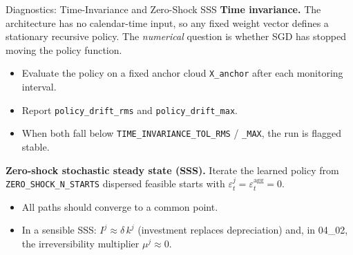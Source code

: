 \documentclass[aspectratio=169,11pt]{beamer}
\newcommand{\emphc}[1]{\textcolor{harvardcrimson}{#1}}
\begin{document}
\begin{frame}{Diagnostics: Time-Invariance and Zero-Shock SSS}
\textbf{Time invariance.}  The architecture has no calendar-time input, so any fixed weight vector defines a stationary recursive policy.  The \emph{numerical} question is whether SGD has stopped moving the policy function.

\vspace{0.2em}
\begin{itemize}
    \item Evaluate the policy on a fixed anchor cloud \texttt{X\_anchor} after each monitoring interval.
    \item Report \texttt{policy\_drift\_rms} and \texttt{policy\_drift\_max}.
    \item When both fall below \texttt{TIME\_INVARIANCE\_TOL\_RMS} / \texttt{\_MAX}, the run is flagged \emphc{stable}.
\end{itemize}

\vspace{0.3em}
\textbf{Zero-shock stochastic steady state (SSS).}  Iterate the learned policy from \texttt{ZERO\_SHOCK\_N\_STARTS} dispersed feasible starts with $\varepsilon^j_t = \varepsilon^{\mathrm{agg}}_t = 0$.

\vspace{0.2em}
\begin{itemize}
    \item All paths should converge to a common point.
    \item In a sensible SSS: $I^j \approx \delta\,k^j$ (investment replaces depreciation) and, in 04\_02, the irreversibility multiplier $\mu^j \approx 0$.
\end{itemize}
\end{frame}
\end{document}
